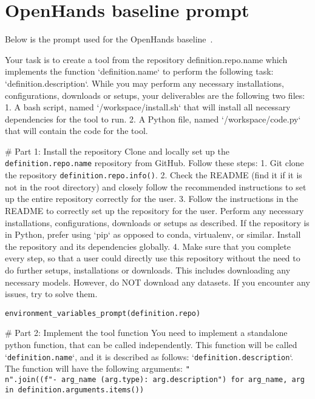 \section{OpenHands baseline prompt}
\label{app:openhands_prompts}
Below is the prompt used for the OpenHands baseline~\cite{wang2024openhands}.
\begin{tcolorbox}[title={\texttt{OpenHands Instructions}}]
Your task is to create a tool from the repository {definition.repo.name} which implements the function `{definition.name}` to perform the following task: `{definition.description}`.
While you may perform any necessary installations, configurations, downloads or setups, your deliverables are the following two files:
1. A bash script, named `/workspace/install.sh` that will install all necessary dependencies for the tool to run.
2. A Python file, named `/workspace/code.py` that will contain the code for the tool.

\# Part 1: Install the repository
Clone and locally set up the \texttt{{definition.repo.name}} repository from GitHub.
Follow these steps:
1. Git clone the repository \texttt{{definition.repo.info()}}.
2. Check the README (find it if it is not in the root directory) and closely follow the recommended instructions to set up the entire repository correctly for the user.
3. Follow the instructions in the README to correctly set up the repository for the user. Perform any necessary installations, configurations, downloads or setups as described. If the repository is in Python, prefer using `pip` as opposed to conda, virtualenv, or similar. Install the repository and its dependencies globally.
4. Make sure that you complete every step, so that a user could directly use this repository without the need to do further setups, installations or downloads. This includes downloading any necessary models. However, do NOT download any datasets.
If you encounter any issues, try to solve them.

\texttt{{environment\_variables\_prompt(definition.repo)}}

\# Part 2: Implement the tool function
You need to implement a standalone python function, that can be called independently. 
This function will be called `\texttt{{definition.name}}`, and it is described as follows: `\texttt{{definition.description}}`.
The function will have the following arguments:
\texttt{{"\\n".join((f"- {arg\_name} ({arg.type}): {arg.description}") for arg\_name, arg in definition.arguments.items())}}


\end{tcolorbox}
